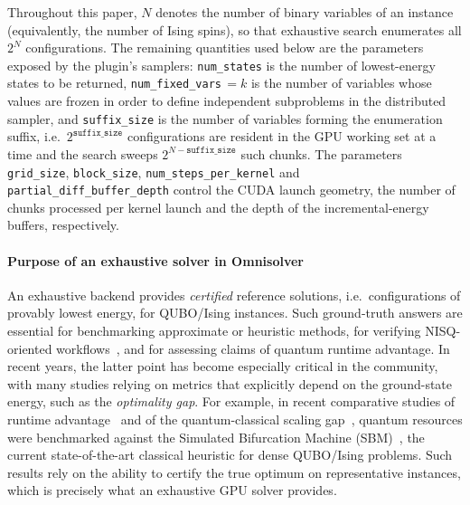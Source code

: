\documentclass[preprint,12pt,a4paper]{elsarticle}
\begin{document}
Throughout this paper, $N$ denotes the number of binary variables of an instance
(equivalently, the number of Ising spins), so that exhaustive search enumerates
all $2^{N}$ configurations. The remaining quantities used below are the
parameters exposed by the plugin's samplers: \texttt{num\_states} is the number
of lowest-energy states to be returned, \texttt{num\_fixed\_vars}\,$=k$ is the
number of variables whose values are frozen in order to define independent
subproblems in the distributed sampler, and \texttt{suffix\_size} is the number
of variables forming the enumeration suffix, i.e.\ $2^{\texttt{suffix\_size}}$
configurations are resident in the GPU working set at a time and the search
sweeps $2^{N-\texttt{suffix\_size}}$ such chunks. The parameters
\texttt{grid\_size}, \texttt{block\_size}, \texttt{num\_steps\_per\_kernel} and
\texttt{partial\_diff\_buffer\_depth} control the CUDA launch geometry, the
number of chunks processed per kernel launch and the depth of the
incremental-energy buffers, respectively.

\paragraph{Purpose of an exhaustive solver in Omnisolver}
An exhaustive backend provides \emph{certified} reference solutions, i.e.\
configurations of provably lowest energy, for QUBO/Ising instances. Such
ground-truth answers are essential for
benchmarking approximate or heuristic methods, for verifying NISQ-oriented
workflows~\cite{preskill2018quantum}, and for assessing claims of quantum
runtime advantage. In recent years, the latter point has become especially
critical in the community, with many studies relying on metrics that
explicitly depend on the ground-state energy, such as the \emph{optimality gap}.
For example, in recent comparative studies of runtime
advantage~\cite{tuziemski2026limits} and of the quantum-classical scaling
gap~\cite{pawlowski2025closing}, quantum resources were benchmarked against the
Simulated Bifurcation Machine
(SBM)~\cite{goto2016bifurcation,goto2019combinatorial,goto2021high,pawlowski2026sbqa},
the current state-of-the-art classical heuristic for dense QUBO/Ising problems.
Such results rely on the ability to certify the true optimum on representative
instances, which is precisely what an exhaustive GPU solver provides.
\end{document}
